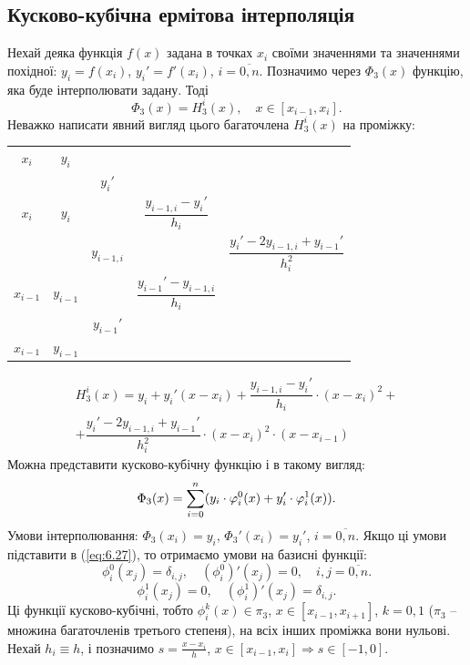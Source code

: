\subsection{Кусково-кубічна ермітова інтерполяція}
Нехай деяка функція $f(x)$ задана в точках $x_i$ своїми значеннями та значеннями похідної: $y_i = f(x_i)$, $y_i'=f'(x_i)$, $i=\overline{0,n}$. Позначимо через $\Phi_3(x)$ функцію, яка буде інтерполювати задану. Тоді 
\begin{equation}
    \label{eq:6.26}
    \Phi_3(x) = H_3^i(x), \quad x \in [x_{i-1},x_i].
\end{equation}
Неважко написати явний вигляд цього багаточлена $H_3^i(x)$ на проміжку:
\begin{table}[H]
    \centering
    \begin{tabular}{c|cccc}
        $x_i$ & $y_i$ & & & \\
        & & $y_i'$ & & \\
        $x_i$ & $y_i$ & & $\dfrac{y_{i-1,i}-y_i'}{h_i}$ & \\
        & & $y_{i-1,i}$ & & $\dfrac{y_i' - 2 y_{i-1,i}+y_{i-1}'}{h_i^2}$ \\
        $x_{i-1}$ & $y_{i-1}$ & & $\dfrac{y_{i-1}'-y_{i-1,i}}{h_i}$ & \\
        & & $y_{i-1}'$ & & \\
        $x_{i-1}$ & $y_{i-1}$ & & & \\
    \end{tabular}
\end{table}
\begin{multline*}
    H_3^i(x) = y_i + y_i'(x-x_i) + \dfrac{y_{i-1,i}-y_i'}{h_i} \cdot (x-x_i)^2 + \\

    + \dfrac{y_i' - 2 y_{i-1,i}+y_{i-1}'}{h_i^2} \cdot (x-x_i)^2 \cdot (x-x_{i-1})
\end{multline*}
Можна представити кусково-кубічну функцію і в такому вигляд:
\begin{equation}
    \label{eq:6.27}
    \Phi_3(x) = \displaystyle\sum\limits_{i=0}^n (y_i \cdot \varphi_i^0 (x) + y_i' \cdot \varphi_i^1(x)).
\end{equation}
Умови інтерполювання: $\Phi_3(x_i)=y_i$, $\Phi_3'(x_i) = y_i'$, $i=\overline{0,n}$. Якщо ці умови підставити в (\ref{eq:6.27}), то отримаємо умови на базисні функції:
\[ \phi_i^0(x_j) = \delta_{i,j}, \quad (\phi_i^0)'(x_j) = 0, \quad i,j=\overline{0,n}. \]
\[ \phi_i^1(x_j) = 0, \quad (\phi_i^1)'(x_j) = \delta_{i,j}. \]
Ці функції кусково-кубічні, тобто $\phi_i^k(x)\in \pi_3$, $x\in[x_{i-1},x_{i+1}]$, $k=0,1$ ($\pi_3$ -- множина багаточленів третього степеня), на всіх інших проміжка вони нульові. Нехай $h_i \equiv h$, і позначимо $s = \frac{x-x_i}{h}$, $x\in[x_{i-1},x_i] \Rightarrow s \in [-1,0]$. 
